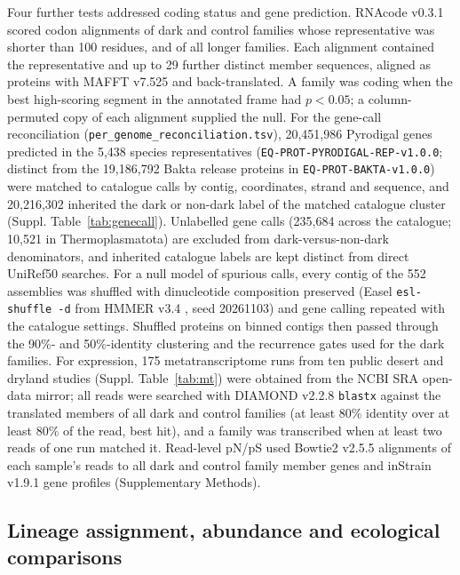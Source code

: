 \documentclass[11pt]{article}
\begin{document}
Four further tests addressed coding status and gene prediction. RNAcode v0.3.1 \citep{washietl2011rnacode} scored codon alignments of dark and control families whose representative was shorter than 100 residues, and of all longer families. Each alignment contained the representative and up to 29 further distinct member sequences, aligned as proteins with MAFFT v7.525 \citep{katoh2013mafft} and back-translated. A family was coding when the best high-scoring segment in the annotated frame had $p<0.05$; a column-permuted copy of each alignment supplied the null. For the gene-call reconciliation (\texttt{per\_genome\_reconciliation.tsv}), 20,451,986 Pyrodigal genes predicted in the 5,438 species representatives (\texttt{EQ-PROT-PYRODIGAL-REP-v1.0.0}; distinct from the 19,186,792 Bakta release proteins in \texttt{EQ-PROT-BAKTA-v1.0.0}) were matched to catalogue calls by contig, coordinates, strand and sequence, and 20,216,302 inherited the dark or non-dark label of the matched catalogue cluster (Suppl. Table~\ref{tab:genecall}). Unlabelled gene calls (235,684 across the catalogue; 10,521 in Thermoplasmatota) are excluded from dark-versus-non-dark denominators, and inherited catalogue labels are kept distinct from direct UniRef50 searches. For a null model of spurious calls, every contig of the 552 assemblies was shuffled with dinucleotide composition preserved (Easel \texttt{esl-shuffle -d} from HMMER v3.4 \citep{eddy2011hmmer}, seed 20261103) and gene calling repeated with the catalogue settings. Shuffled proteins on binned contigs then passed through the 90\%- and 50\%-identity clustering and the recurrence gates used for the dark families. For expression, 175 metatranscriptome runs from ten public desert and dryland studies (Suppl. Table~\ref{tab:mt}) were obtained from the NCBI SRA open-data mirror; all reads were searched with DIAMOND v2.2.8 \texttt{blastx} against the translated members of all dark and control families (at least 80\% identity over at least 80\% of the read, best hit), and a family was transcribed when at least two reads of one run matched it. Read-level pN/pS used Bowtie2 v2.5.5 \citep{langmead2012bowtie2} alignments of each sample's reads to all dark and control family member genes and inStrain v1.9.1 \citep{olm2021instrain} gene profiles (Supplementary Methods).

\subsection*{Lineage assignment, abundance and ecological comparisons}
\end{document}
